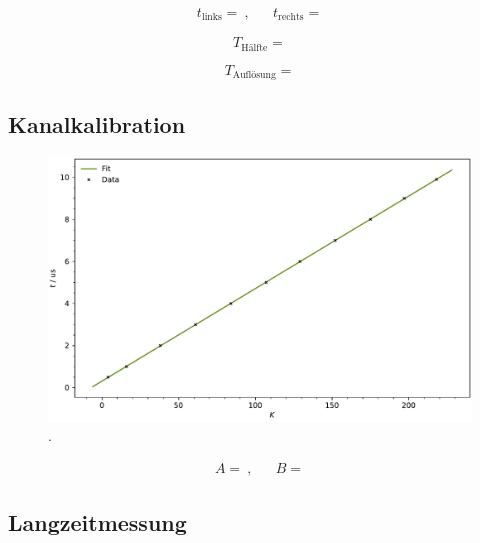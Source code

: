 \begin{align*}
	t_\text{links} =  \: , && t_\text{rechts} = 
\end{align*}

\begin{equation*}
	T_\text{Hälfte} = 
\end{equation*}

\begin{equation*}
	T_\text{Auflösung} = 
\end{equation*}



\subsection{Kanalkalibration}

\begin{figure}[H]
	\centering
	\includegraphics[width=\textwidth]{build/calibration.pdf}
	\caption{.}
	\label{fig:calibration}
\end{figure}

\begin{align*}
	A =  \: , && B = 
\end{align*}



\subsection{Langzeitmessung}

